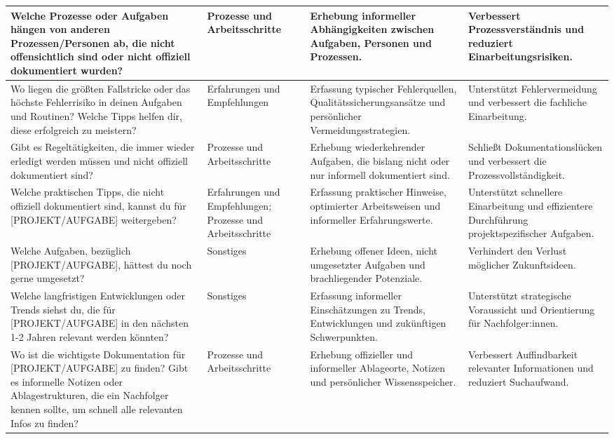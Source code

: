 \documentclass[
  10pt,
  ngerman,
  a4paper,
  toc=graduated,
  numbers=noenddot,
  headings=standardclasses,
  nonumberlist
]{scrartcl}
\begin{document}
\begin{longtable}{|L{4.9cm}|L{3.1cm}|L{3.8cm}|L{3.3cm}|}
Welche Prozesse oder Aufgaben hängen von anderen Prozessen/Personen ab, die nicht offensichtlich sind oder nicht offiziell dokumentiert wurden?
& Prozesse und Arbeitsschritte
& Erhebung informeller Abhängigkeiten zwischen Aufgaben, Personen und Prozessen.
& Verbessert Prozessverständnis und reduziert Einarbeitungsrisiken. \\
\hline

Wo liegen die größten Fallstricke oder das höchste Fehlerrisiko in deinen Aufgaben und Routinen? Welche Tipps helfen dir, diese erfolgreich zu meistern?
& Erfahrungen und Empfehlungen
& Erfassung typischer Fehlerquellen, Qualitätssicherungsansätze und persönlicher Vermeidungsstrategien.
& Unterstützt Fehlervermeidung und verbessert die fachliche Einarbeitung. \\
\hline

Gibt es Regeltätigkeiten, die immer wieder erledigt werden müssen und nicht offiziell dokumentiert sind?
& Prozesse und Arbeitsschritte
& Erhebung wiederkehrender Aufgaben, die bislang nicht oder nur informell dokumentiert sind.
& Schließt Dokumentationslücken und verbessert die Prozessvollständigkeit. \\
\hline

Welche praktischen Tipps, die nicht offiziell dokumentiert sind, kannst du für [PROJEKT/AUFGABE] 
weitergeben?
& Erfahrungen und Empfehlungen; Prozesse und Arbeitsschritte
& Erfassung praktischer Hinweise, optimierter Arbeitsweisen und informeller Erfahrungswerte.
& Unterstützt schnellere Einarbeitung und effizientere Durchführung projektspezifischer Aufgaben. \\
\hline

Welche Aufgaben, bezüglich [PROJEKT/AUFGABE], hättest du noch gerne umgesetzt?
& Sonstiges
& Erhebung offener Ideen, nicht umgesetzter Aufgaben und brachliegender Potenziale.
& Verhindert den Verlust möglicher Zukunftsideen. \\
\hline

Welche langfristigen Entwicklungen oder Trends siehst du, die für [PROJEKT/AUFGABE] in den nächsten 1-2 Jahren relevant werden könnten?
& Sonstiges
& Erfassung informeller Einschätzungen zu Trends, Entwicklungen und zukünftigen Schwerpunkten.
& Unterstützt strategische Voraussicht und Orientierung für Nachfolger:innen. \\
\hline

Wo ist die wichtigste Dokumentation für [PROJEKT/AUFGABE] zu finden? Gibt es informelle Notizen oder Ablagestrukturen, die ein Nachfolger kennen sollte, um schnell alle relevanten Infos zu finden?
& Prozesse und Arbeitsschritte
& Erhebung offizieller und informeller Ablageorte, Notizen und persönlicher Wissensspeicher.
& Verbessert Auffindbarkeit relevanter Informationen und reduziert Suchaufwand. \\
\hline


\end{longtable}
\end{document}

